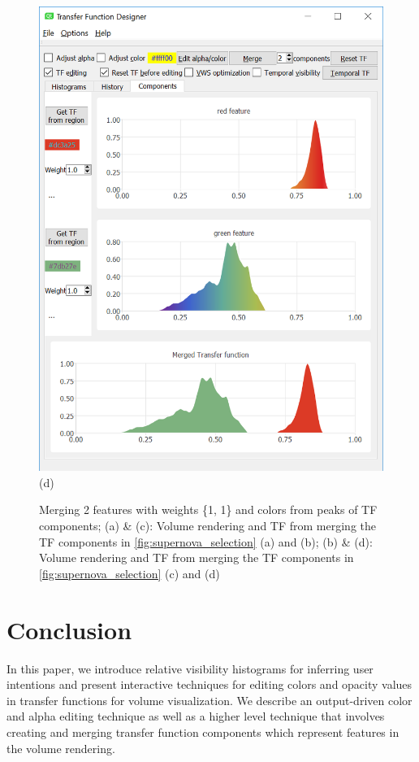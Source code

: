 \documentclass[twoside,twocolumn,10pt]{article}
\begin{document}
\begin{figure}
\begin{minipage}{.4\textwidth}
		\includegraphics[width=1\linewidth]{tf_supernova_merged_segment_red_green}
		(d)
	\end{minipage}
	\caption{Merging 2 features with weights \{1, 1\} and colors from peaks of TF components; (a) \& (c): Volume rendering and TF from merging the TF components in \autoref{fig:supernova_selection} (a) and (b); (b) \& (d): Volume rendering and TF from merging the TF components in \autoref{fig:supernova_selection} (c) and (d)}
	\label{fig:supernova_merge}
\end{figure}

\section{Conclusion}
In this paper, we introduce relative visibility histograms for inferring user intentions and present interactive techniques for editing colors and opacity values in transfer functions for volume visualization. We describe an output-driven color and alpha editing technique as well as a higher level technique that involves creating and merging transfer function components which represent features in the volume rendering.
\end{document}
